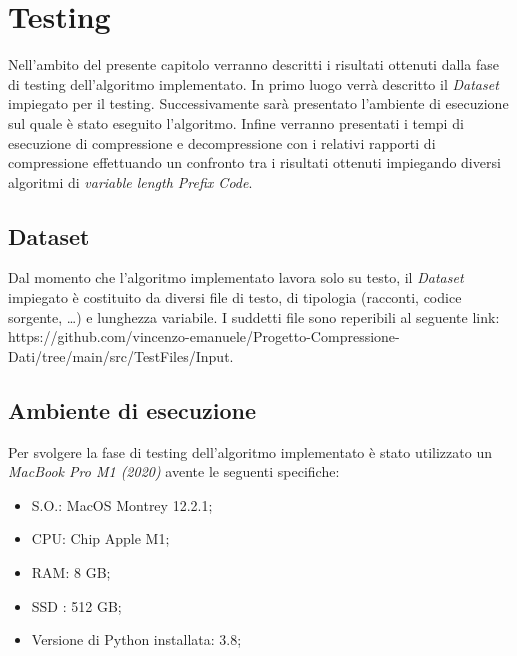 \chapter{Testing} 

\begin{citazione}
Nell'ambito del presente capitolo verranno descritti i risultati ottenuti dalla fase di testing dell'algoritmo implementato. In primo luogo verrà descritto il \emph{Dataset} impiegato per il testing. Successivamente sarà presentato l'ambiente di esecuzione sul quale è stato eseguito l'algoritmo. Infine verranno presentati i tempi di esecuzione di compressione e decompressione con i relativi rapporti di compressione effettuando un confronto tra i risultati ottenuti impiegando diversi algoritmi di \emph{variable length Prefix Code}.
\end{citazione}
\newpage

\section{Dataset}
Dal momento che l'algoritmo implementato lavora solo su testo, il \emph{Dataset} impiegato è costituito da diversi file di testo, di tipologia (racconti, codice sorgente, \dots) e lunghezza variabile. I suddetti file sono reperibili al seguente link: https://github.com/vincenzo-emanuele/Progetto-Compressione-Dati/tree/main/src/TestFiles/Input. 
\section{Ambiente di esecuzione}
Per svolgere la fase di testing dell'algoritmo implementato è stato utilizzato un \emph{MacBook Pro M1 (2020)} avente le seguenti specifiche:
\begin{itemize}
    \item S.O.: MacOS Montrey 12.2.1;
    \item CPU: Chip Apple M1;
    \item RAM: 8 GB;
    \item SSD : 512 GB;
    \item Versione di Python installata: 3.8;
\end{itemize}
